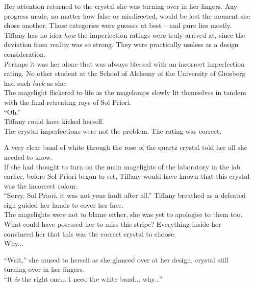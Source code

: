 Her attention returned to the crystal she was turning over in her fingers.
Any progress made, no matter how false or misdirected, would be lost the moment she chose another.
Those categories were guesses at best -- and pure lies mostly. 
Tiffany has no idea \textit{how} the imperfection ratings were truly arrived at, since the deviation from reality was so strong. 
They were practically useless as a design consideration.\\

Perhaps it was her alone that was always blessed with an incorrect imperfection rating.
No other student at the School of Alchemy of the University of Grosberg had such \textit{luck} as she.\\

The magelight flickered to life as the magelamps slowly lit themselves in tandem with the final retreating rays of Sol Priori.\\

``Oh.''\\

Tiffany could have kicked herself.\\

The crystal imperfections were not the problem. 
The rating was correct.

A very clear band of white through the rose of the quartz crystal told her all she needed to know.\\

If she had thought to turn on the main magelights of the laboratory in the lab earlier, before Sol Priori began to set, Tiffany would have known that this crystal was the incorrect colour.\\

``Sorry, Sol Priori, it was not your fault after all.'' Tiffany breathed as a defeated sigh guided her hands to cover her face.\\

The magelights were not to blame either, she was yet to apologise to them too.
What could have posessed her to miss this stripe? 
Everything inside her convinced her that this was the correct crystal to choose.\\

Why...

``Wait,'' she mused to herself as she glanced over at her design, crystal still turning over in her fingers.\\

``It \textit{is} the right one... I need the white band... why...''\\

